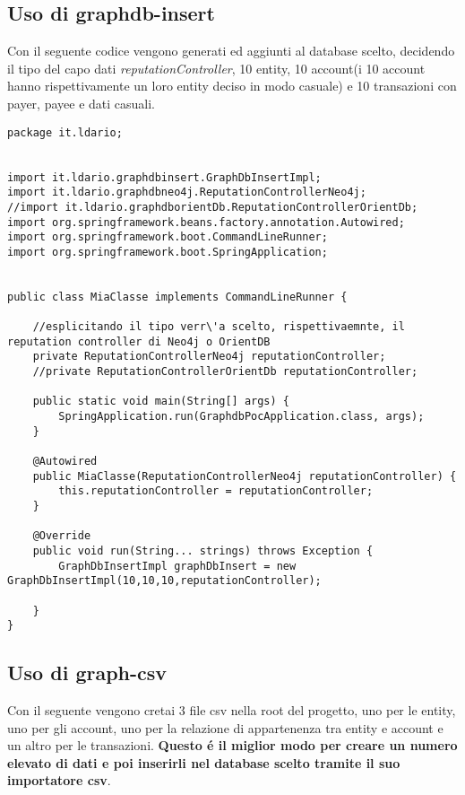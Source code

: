 \subsection{Uso di graphdb-insert}
Con il seguente codice vengono generati ed aggiunti al database scelto, decidendo il tipo del capo dati \textit{reputationController}, 10 entity, 10 account(i 10 account hanno rispettivamente un loro entity deciso in modo casuale) e 10 transazioni con payer, payee e dati casuali.
\begin{lstlisting}
package it.ldario;


import it.ldario.graphdbinsert.GraphDbInsertImpl;
import it.ldario.graphdbneo4j.ReputationControllerNeo4j;
//import it.ldario.graphdborientDb.ReputationControllerOrientDb;
import org.springframework.beans.factory.annotation.Autowired;
import org.springframework.boot.CommandLineRunner;
import org.springframework.boot.SpringApplication;


public class MiaClasse implements CommandLineRunner {

    //esplicitando il tipo verr\'a scelto, rispettivaemnte, il reputation controller di Neo4j o OrientDB
    private ReputationControllerNeo4j reputationController;
    //private ReputationControllerOrientDb reputationController;

    public static void main(String[] args) {
        SpringApplication.run(GraphdbPocApplication.class, args);
    }

    @Autowired
    public MiaClasse(ReputationControllerNeo4j reputationController) {
        this.reputationController = reputationController;
    }

    @Override
    public void run(String... strings) throws Exception {
        GraphDbInsertImpl graphDbInsert = new GraphDbInsertImpl(10,10,10,reputationController);

    }
}
\end{lstlisting}

\subsection{Uso di graph-csv}
Con il seguente vengono cretai 3 file csv nella root del progetto, uno per le entity, uno per gli account, uno per la relazione di appartenenza tra entity e account e un altro per le transazioni. \textbf{Questo \'e il miglior modo per creare un numero elevato di dati e poi inserirli nel database scelto tramite il suo importatore csv}.

